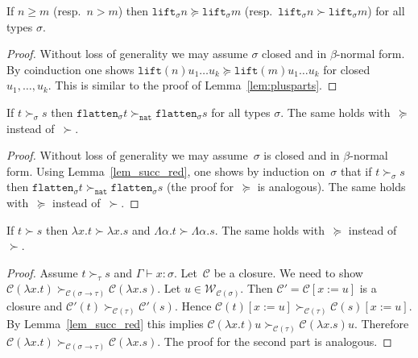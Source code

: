\documentclass[runningheads,a4paper]{llncs}
\newcommand{\World}{\mathcal{W}}
\newcommand{\cl}{\mathcal{C}}
\newcommand{\arrtype}{\rightarrow}
\newcommand{\abs}[2]{\lambda #1.#2}
\newcommand{\tabs}[2]{\Lambda #1.#2}
\newcommand{\subst}[2]{#1:=#2}
\newcommand{\nat}{\mathtt{nat}}
\newcommand{\flatten}{\mathtt{flatten}}
\newcommand{\lift}{\mathtt{lift}}
\newcommand{\proves}{\vdash}
\begin{document}
\begin{lemma}\label{lem:liftgreater}
  If $n \geq m$ (resp.~$n > m$) then $\lift_\sigma n \succeq
  \lift_\sigma m$ (resp.~$\lift_\sigma n \succ \lift_\sigma m$) for
  all types $\sigma$.
\end{lemma}

\begin{proof}
  Without loss of generality we may assume $\sigma$ closed and in
  $\beta$-normal form. By coinduction one shows $\lift(n) u_1 \ldots
  u_k \succeq \lift(m) u_1 \ldots u_k$ for closed
  $u_1,\ldots,u_k$. This is similar to the proof of
  Lemma~\ref{lem:plusparts}.
\end{proof}

\begin{lemma}\label{lem_flatten_succ}
  If $t \succ_\sigma s$ then $\flatten_\sigma t \succ_\nat
  \flatten_\sigma s$ for all types $\sigma$. The same holds
  with~$\succeq$ instead of~$\succ$.
\end{lemma}

\begin{proof}
  Without loss of generality we may assume~$\sigma$ is closed and in
  $\beta$-normal form. Using Lemma~\ref{lem_succ_red}, one shows by
  induction on~$\sigma$ that if $t \succ_\sigma s$ then
  $\flatten_\sigma t \succ_\nat \flatten_\sigma s$ (the proof
  for~$\succeq$ is analogous). The same holds with~$\succeq$ instead
  of~$\succ$.
\end{proof}

\begin{lemma}\label{lem_abs_succ}
  If $t \succ s$ then $\abs{x}{t} \succ \abs{x}{s}$ and
  $\tabs{\alpha}{t} \succ \tabs{\alpha}{s}$. The same holds
  with~$\succeq$ instead of~$\succ$.
\end{lemma}

\begin{proof}
  Assume $t \succ_\tau s$ and $\Gamma \proves x : \sigma$. Let~$\cl$
  be a closure. We need to show $\cl(\abs{x}{t})
  \succ_{\cl(\sigma\arrtype\tau)} \cl(\abs{x}{s})$. Let $u \in
  \World_{\cl(\sigma)}$. Then $\cl' = \cl[\subst{x}{u}]$ is a closure
  and $\cl'(t) \succ_{\cl(\tau)} \cl'(s)$. Hence $\cl(t)[\subst{x}{u}]
  \succ_{\cl(\tau)} \cl(s)[\subst{x}{u}]$. By Lemma~\ref{lem_succ_red}
  this implies $\cl(\abs{x}{t}) u \succ_{\cl(\tau)} \cl(\abs{x}{s})
  u$. Therefore $\cl(\abs{x}{t}) \succ_{\cl(\sigma\arrtype\tau)}
  \cl(\abs{x}{s})$. The proof for the second part is analogous.
\end{proof}
\end{document}

